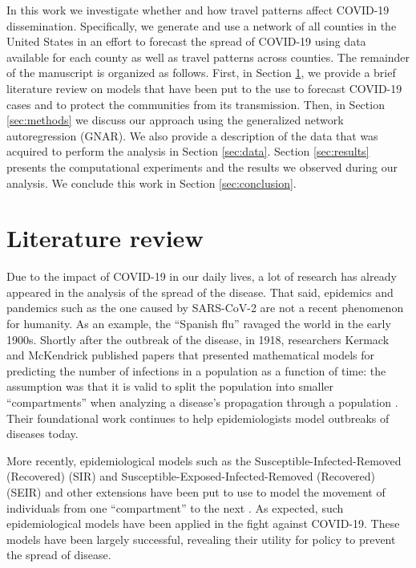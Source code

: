 In this work we investigate whether and how travel patterns affect COVID-19 dissemination. Specifically, we generate and use a network of all counties in the United States in an effort to forecast the spread of COVID-19 using data available for each county as well as travel patterns across counties. The remainder of the manuscript is organized as follows. First, in Section \ref{sec:lit_review}, we provide a brief literature review on models that have been put to the use to forecast COVID-19 cases and to protect the communities from its transmission. Then, in Section \ref{sec:methods} we discuss our approach using the generalized network autoregression (GNAR). We also provide a description of the data that was acquired to perform the analysis in Section \ref{sec:data}. Section \ref{sec:results} presents the computational experiments and the results we observed during our analysis. We conclude this work in Section \ref{sec:conclusion}.


\section{Literature review}
\label{sec:lit_review}

Due to the impact of COVID-19 in our daily lives, a lot of research has already appeared in the analysis of the spread of the disease. That said, epidemics and pandemics such as the one caused by SARS-CoV-2 are not a recent phenomenon for humanity. As an example, the ``Spanish flu'' ravaged the world in the early 1900s. Shortly after the outbreak of the disease, in 1918, researchers  Kermack and  McKendrick published papers that presented mathematical models for predicting the number of infections in a population as a function of time: the assumption was that it is valid to split the population into smaller ``compartments'' when analyzing a disease's propagation through a population \cite{Kermack:1991}. Their foundational work continues to help epidemiologists model outbreaks of diseases today.

More recently, epidemiological models such as the Susceptible-Infected-Removed (Recovered) (SIR) and Susceptible-Exposed-Infected-Removed (Recovered) (SEIR) and other extensions have been put to use to model the movement of individuals from one ``compartment'' to the next \cite{rodrigues2016application}. As expected, such epidemiological models have been applied in the fight against COVID-19. These models have been largely successful, revealing their utility for policy to prevent the spread of disease. %

